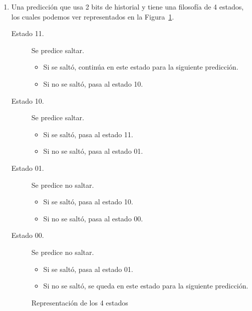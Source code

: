 \begin{enumerate}
    \item Una predicción que usa 2 bits de historial y tiene una filosofía de 4 estados, los cuales podemos ver representados en la Figura~\ref{fig:grafo_4estados_prediccion}.
        \begin{description}
            \item [Estado 11.] Se predice saltar.
                \begin{itemize}
                    \item Si se saltó, continúa en este estado para la siguiente predicción.
                    \item Si no se saltó, pasa al estado 10.
                \end{itemize}
            \item [Estado 10.] Se predice saltar.
                \begin{itemize}
                    \item Si se saltó, pasa al estado 11.
                    \item Si no se saltó, pasa al estado 01.
                \end{itemize}
            \item [Estado 01.] Se predice no saltar.
                \begin{itemize}
                    \item Si se saltó, pasa al estado 10.
                    \item Si no se saltó, pasa al estado 00.
                \end{itemize}
            \item [Estado 00.] Se predice no saltar.
                \begin{itemize}
                    \item Si se saltó, pasa al estado 01.
                    \item Si no se saltó, se queda en este estado para la siguiente predicción.
                \end{itemize}
        \end{description}

\begin{figure}[H]
\centering
{}
\caption{Representación de los 4 estados}
\label{fig:grafo_4estados_prediccion}
\end{figure}


\end{enumerate}
